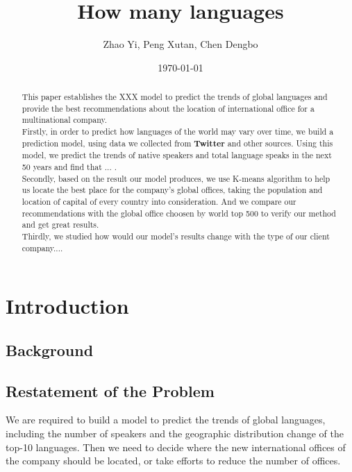 \documentclass{mcmthesis}
\title {How many languages}
\author{Zhao Yi, Peng Xutan, Chen Dengbo}
\date{\today}
\begin{document}
\begin{abstract}

  \indent This paper establishes the XXX model to predict the trends of global languages and provide the best recommendations about the location of international office for a multinational company.\\
  \indent Firstly, in order to predict how languages of the world may vary over time, we build a prediction model, using data we collected from \textbf{Twitter} and other sources. Using this model, we predict the trends of native speakers and total language speaks in the next 50 years and find that ... .\\
  \indent Secondly, based on the result our model produces, we use K-means algorithm to help us locate the best place for the company's global offices, taking the population and location of capital of every country into consideration. And we compare our recommendations with the global office choosen by world top 500 to verify our method and get great results.\\
  \indent Thirdly, we studied how would our model's results change with the type of our client company....
\begin{keywords}
\end{keywords}
\end{abstract}
\maketitle
\pagestyle{empty}
\newpage
\tableofcontents
\newpage
\pagestyle{fancy}
\setcounter{page}{1}
\section{Introduction}
\subsection{Background}
\subsection{Restatement of the Problem}
  \indent \indent We are required to build a model to predict the trends of global languages, including the number of speakers and the geographic distribution change of the top-10 languages. Then we need to decide where the new international offices of the company should be located, or take efforts to reduce the number of offices.
\end{document}
